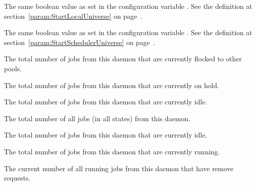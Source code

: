 \begin{description}
\item[\AdAttr{StartLocalUniverse}:] The same boolean value as set in the
  configuration variable .
  See the definition at section~\ref{param:StartLocalUniverse} on
  page~\pageref{param:StartLocalUniverse}.

\item[\AdAttr{StartSchedulerUniverse}:] The same boolean value as set in the
  configuration variable .
  See the definition at section~\ref{param:StartSchedulerUniverse} on
  page~\pageref{param:StartSchedulerUniverse}.

\item[\AdAttr{TotalFlockedJobs}:] The total number of jobs from this
   daemon that are currently flocked to other pools.

\item[\AdAttr{TotalHeldJobs}:] The total number of jobs from this
   daemon that are currently on hold.

\item[\AdAttr{TotalIdleJobs}:] The total number of jobs from this
   daemon that are currently idle.

\item[\AdAttr{TotalJobAds}:] The total number of all jobs (in all 
  states) from this  daemon.

\item[\AdAttr{TotalLocalIdleJobs}:] The total number of 
    jobs from this
   daemon that are currently idle.

\item[\AdAttr{TotalLocalRunningJobs}:] The total number of 
    jobs from this
   daemon that are currently running.

\item[\AdAttr{TotalRemovedJobs}:] The current number of all running jobs
  from this  daemon that have remove requests.


\end{description}
